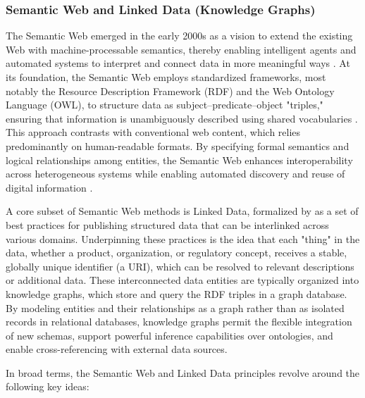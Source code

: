\subsubsection*{Semantic Web and Linked Data (Knowledge Graphs)}
The Semantic Web emerged in the early 2000s as a vision to extend the existing Web with machine-processable semantics, thereby enabling intelligent agents and automated systems to interpret and connect data in more meaningful ways \autocite{BernersLee.2001}. At its foundation, the Semantic Web employs standardized frameworks, most notably the Resource Description Framework (RDF) and the Web Ontology Language (OWL), to structure data as subject–predicate–object "triples," ensuring that information is unambiguously described using shared vocabularies \autocite{Antoniou.2008, WorldWideWebConsortium.2014}. This approach contrasts with conventional web content, which relies predominantly on human-readable formats. By specifying formal semantics and logical relationships among entities, the Semantic Web enhances interoperability across heterogeneous systems while enabling automated discovery and reuse of digital information \autocite{Hogan.2022}.

A core subset of Semantic Web methods is Linked Data, formalized by \textcite{BernersLee.2006} as a set of best practices for publishing structured data that can be interlinked across various domains. Underpinning these practices is the idea that each "thing" in the data, whether a product, organization, or regulatory concept, receives a stable, globally unique identifier (a URI), which can be resolved to relevant descriptions or additional data. These interconnected data entities are typically organized into knowledge graphs, which store and query the RDF triples in a graph database. By modeling entities and their relationships as a graph rather than as isolated records in relational databases, knowledge graphs permit the flexible integration of new schemas, support powerful inference capabilities over ontologies, and enable cross-referencing with external data sources. \autocite{Heath.2011, Hogan.2022, BernersLee.2006}

In broad terms, the Semantic Web and Linked Data principles revolve around the following key ideas:

